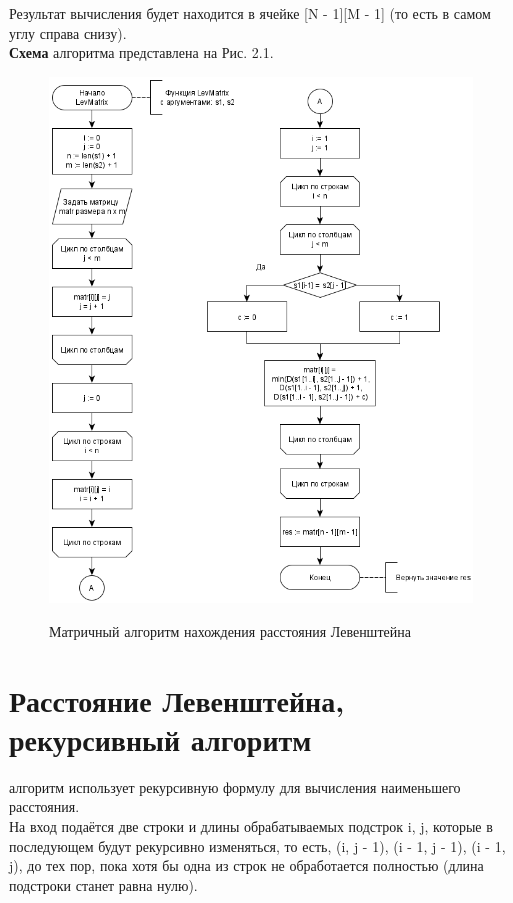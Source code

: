 \documentclass[12pt]{report}
\begin{document}
Результат вычисления будет находится в ячейке [N - 1][M - 1] (то есть в самом углу справа снизу).\\

\textbf{Схема} алгоритма представлена на Рис. 2.1.

\begin{figure}[h]
	\begin{center}
		{\includegraphics[scale = 1]{LevMatrix}}
		\caption{Матричный алгоритм нахождения расстояния Левенштейна}
	\end{center}
\end{figure}

\section{Расстояние Левенштейна, рекурсивный алгоритм}
 алгоритм использует рекурсивную формулу для вычисления наименьшего расстояния. \\

На вход подаётся две строки и длины обрабатываемых подстрок i, j, которые в последующем будут рекурсивно изменяться, то есть, (i, j - 1), (i - 1, j - 1), (i - 1, j), до тех пор, пока хотя бы одна из строк не обработается полностью (длина подстроки станет равна нулю). \\
\end{document}

